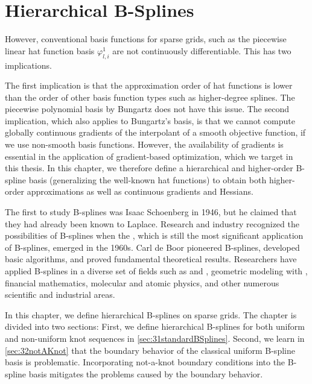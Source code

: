 
\chapter{Hierarchical B-Splines}
\label{chap:30BSplines}





However, conventional basis functions for sparse grids,
such as the piecewise linear hat function basis $\varphi_{l,i}^1$
are not continuously differentiable.
This has two implications.

The first implication is that the approximation order of hat functions
is lower than the order of other basis function types
such as higher-degree splines.
The piecewise polynomial basis by Bungartz \cite{Bungartz98Finite}
does not have this issue.
The second implication, which also applies to Bungartz's basis,
is that we cannot compute globally continuous gradients of the
interpolant of a smooth objective function,
if we use non-smooth basis functions.
However, the availability of gradients is
essential in the application of gradient-based optimization,
which we target in this thesis.
In this chapter, we therefore define a hierarchical and
higher-order B-spline basis
(generalizing the well-known hat functions)
to obtain both higher-order approximations
as well as continuous gradients and Hessians.

The first to study B-splines was Isaac Schoenberg in 1946,
but he claimed that they had already been known to Laplace.
Research and industry recognized the possibilities of B-splines when
the \fem, which is still the most significant application of B-splines,
emerged in the 1960s.
Carl de Boor pioneered B-splines, developed basic algorithms, and
proved fundamental theoretical results.
Researchers have applied B-splines in a diverse set of fields such as
\fem and \iga,
geometric modeling with \nurbs,
financial mathematics,
molecular and atomic physics,
and other numerous scientific and industrial areas.

In this chapter, we define hierarchical B-splines on sparse grids.
The chapter is divided into two sections:
First, we define hierarchical B-splines for both
uniform and non-uniform knot sequences in \cref{sec:31standardBSplines}.
Second, we learn in \cref{sec:32notAKnot} that the boundary behavior
of the classical uniform B-spline basis is problematic.
Incorporating not-a-knot boundary conditions into the B-spline basis
mitigates the problems caused by the boundary behavior.






\cleardoublepage
